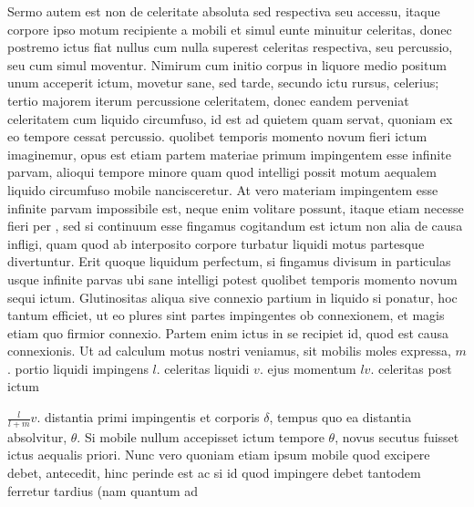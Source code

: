 Sermo autem est non de celeritate absoluta sed respectiva seu accessu, itaque corpore ipso motum recipiente a mobili 
%
%
et simul eunte minuitur celeritas, donec postremo ictus fiat nullus cum nulla superest celeritas respectiva, seu percussio, seu cum simul moventur. Nimirum cum initio corpus in liquore medio positum unum acceperit ictum, movetur sane, sed tarde, secundo ictu rursus, celerius; tertio majorem iterum 
percussione celeritatem, donec 
%
%
eandem perveniat celeritatem cum liquido circumfuso, id est ad quietem quam servat, quoniam ex eo tempore cessat percussio\protect{}. 
quolibet temporis momento novum fieri ictum imaginemur, opus est etiam partem materiae primum impingentem esse infinite parvam, alioqui tempore minore quam quod intelligi possit motum aequalem liquido circumfuso mobile nancisceretur. At vero materiam impingentem esse infinite parvam 
%
%
impossibile est, neque enim 
volitare possunt, itaque etiam necesse 
fieri per ,
sed si continuum esse fingamus cogitandum est ictum non alia de causa infligi, quam quod ab interposito corpore turbatur liquidi motus partesque divertuntur. Erit quoque liquidum perfectum, si fingamus divisum in particulas usque infinite parvas ubi sane intelligi 
%
%
potest quolibet temporis momento novum sequi ictum. Glutinositas aliqua sive connexio partium in liquido si ponatur, hoc tantum efficiet, ut eo plures sint partes impingentes ob connexionem, et magis etiam quo firmior connexio. Partem enim ictus in se recipiet id, quod est causa connexionis.
\pend
\pstart
Ut ad calculum motus nostri veniamus, sit mobilis moles\protect{} expressa, $\displaystyle m$. portio 
%
%
liquidi impingens $\displaystyle l$. celeritas liquidi $\displaystyle v$. ejus momentum\protect{} $\displaystyle lv$. celeritas post ictum \rule[-4mm]{0mm}{10mm}$\displaystyle \frac{l}{l + m} v$. distantia primi impingentis et corporis $\displaystyle \delta$, tempus quo ea distantia absolvitur, $\displaystyle \theta$. Si mobile nullum accepisset ictum  tempore $\displaystyle \theta$, novus secutus fuisset ictus aequalis priori. Nunc vero quoniam etiam ipsum mobile quod excipere debet, antecedit, hinc perinde est ac si id quod impingere debet tantodem ferretur tardius (nam quantum ad 
